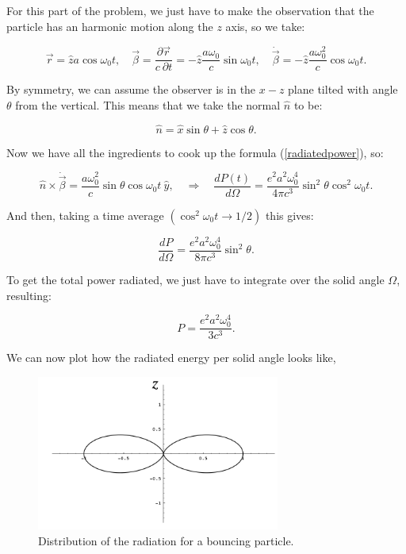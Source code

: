For this part of the problem, we just have to make the observation that the particle has an harmonic motion along the $z$ axis, so we take:

\begin{equation}
	\vec{r}=\hat{z} a \cos \omega_{0} t, \quad \vec{\beta}= \frac{\partial \vec{r}}{c\: \partial t} = -\hat{z} \frac{a \omega_{0}}{c} \sin \omega_{0} t, \quad \dot{\vec{\beta}}=-\hat{z} \frac{a \omega_{0}^{2}}{c} \cos \omega_{0} t.
\end{equation}

	
By symmetry, we can assume the observer is in the $x-z$ plane tilted with angle $\theta$ from the vertical. This means that we take the normal $\hat{n}$ to be:

\begin{equation}
	\hat{n}=\hat{x} \sin \theta+\hat{z} \cos \theta.
\end{equation}

Now we have all the ingredients to cook up the formula (\ref{radiatedpower}), so:

\begin{equation}
	\hat{n} \times \dot{\vec{\beta}}= \frac{a \omega_{0}^{2}}{c} \sin \theta \cos \omega_{0} t \: \hat{y}, \quad \Rightarrow \quad \frac{d P(t)}{d \Omega}=\frac{e^{2} a^{2} \omega_{0}^{4}}{4 \pi c^{3}} \sin ^{2} \theta \cos ^{2} \omega_{0} t.
\end{equation}

And then, taking a time average $\left(\cos ^{2} \omega_{0} t \rightarrow 1 / 2\right)$ this gives:

\begin{equation}
	\frac{d P}{d \Omega}=\frac{e^{2} a^{2} \omega_{0}^{4}}{8 \pi c^{3}} \sin ^{2} \theta.
\end{equation}

To get the total power radiated, we just have to integrate over the solid angle $\Omega$, resulting:

\begin{equation}
	P=\frac{e^{2} a^{2} \omega_{0}^{4}}{3 c^{3}}.
\end{equation}

We can now plot how the radiated energy per solid angle looks like,

\begin{figure}[h]
	\includegraphics[width=8cm]{figures/RadiatingJackson1.png}
	\centering
	\caption{Distribution of the radiation for a bouncing particle.}
\end{figure}

